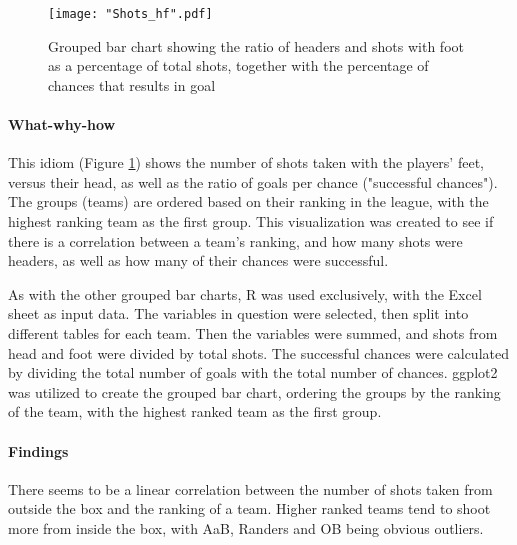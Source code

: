 \documentclass[Report.tex]{subfiles}
\begin{document}
\begin{figure}
\center
\texttt{[image: "Shots\_hf".pdf]}
\caption{Grouped bar chart showing the ratio of headers and shots with foot as
a percentage of total shots, together with the percentage of chances that
results in goal}
\label{Fig:Shots_HF} 
\end{figure}

\paragraph{What-why-how\\}
This idiom (Figure \ref{Fig:Shots_HF}) shows the number of shots taken with the players' feet,
versus their head, as well as the ratio of goals per chance ("successful
chances"). The groups (teams) are ordered based on their ranking in the league,
with the highest ranking team as the first group. 
This visualization was created to see if
there is a correlation between a team's ranking, and how many shots were headers,
as well as how many of their chances were successful.

As with the other grouped bar charts, R was used exclusively, with the Excel
sheet as input data. 
The variables in question were selected, then split into different tables for
each team. Then the variables were summed, and shots from head and foot were
divided by total shots. The successful chances were calculated by dividing the
total number of goals with the total number of chances. 
ggplot2 was utilized to create the grouped bar chart, ordering the groups by the
ranking of the team, with the highest ranked team as the first group.

\paragraph{Findings\\}
There seems to be a linear correlation between the number of shots taken from outside the box
and the ranking of a team. Higher ranked teams tend to shoot more from inside the box, with AaB, Randers and OB being obvious outliers. 
\end{document}

